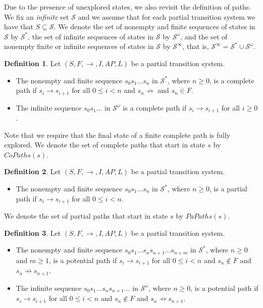 \documentclass[12pt]{article}
\theoremstyle{definition}
\newtheorem{definition}{Definition}
\begin{document}
Due to the presence of unexplored states, we also revisit the definition of paths.  We fix an \emph{infinite} set $\mathcal{S}$ and we assume that for each partial transition system we have that $S \subseteq \mathcal{S}$.  We denote the set of nonempty and finite sequences of states in $\mathcal{S}$ by $\mathcal{S}^*$, the set of infinite sequences of states in $\mathcal{S}$ by $\mathcal{S}^{\omega}$, and the set of nonempty finite or infinite sequences of states in $\mathcal{S}$ by $\mathcal{S}^{\infty}$, that is, $\mathcal{S}^{\infty} = \mathcal{S}^* \cup \mathcal{S}^{\omega}$.

\begin{definition}
\label{definition:complete-path}
Let $(S, F, \rightarrow, I, \mathit{AP}, L)$ be a partial transition system.
\begin{itemize}
\item 
The nonempty and finite sequence $s_0 s_1 \ldots s_n$ in $\mathcal{S}^*$, where $n \geq 0$, is a complete path if $s_i \rightarrow s_{i+1}$ for all $0 \leq i < n$ and $s_n \not\rightarrow$ and $s_n \in F$.
\item 
The infinite sequence $s_0 s_1 \ldots$ in $\mathcal{S}^{\omega}$ is a complete path if $s_i \rightarrow s_{i+1}$ for all $i \geq 0$. 
\end{itemize}
\end{definition}

Note that we require that the final state of a finite complete path is fully explored.  We denote the set of complete paths that start in state $s$ by $\mathit{CoPaths}(s)$.

\begin{definition}
\label{definition:partial-path}
Let $(S, F, \rightarrow, I, \mathit{AP}, L)$ be a partial transition system.
\begin{itemize}
\item 
The nonempty and finite sequence $s_0 s_1 \ldots s_n$ in $\mathcal{S}^*$, where $n \geq 0$, is a partial path if $s_i \rightarrow s_{i+1}$ for all $0 \leq i < n$.
\end{itemize}
\end{definition}

We denote the set of partial paths that start in state $s$ by $\mathit{PaPaths}(s)$.

\begin{definition}
Let $(S, F, \rightarrow, I, \mathit{AP}, L)$ be a partial transition system.
\begin{itemize}
\item 
The nonempty and finite sequence $s_0 s_1 \ldots s_n s_{n+1} \ldots s_{n+m}$ in $\mathcal{S}^*$, where $n \geq 0$ and $m \geq 1$, is a potential path if $s_i \rightarrow s_{i+1}$ for all $0 \leq i < n$ and $s_n \not\in F$ and $s_n \not\rightarrow s_{n+1}$.
\item 
The infinite sequence $s_0 s_1 \ldots s_n s_{n+1} \ldots$ in $\mathcal{S}^{\omega}$, where $n \geq 0$, is a potential path if $s_i \rightarrow s_{i+1}$ for all $0 \leq i < n$ and $s_n \not\in F$ and $s_n \not\rightarrow s_{n+1}$.
\end{itemize}
\end{definition}
\end{document}
